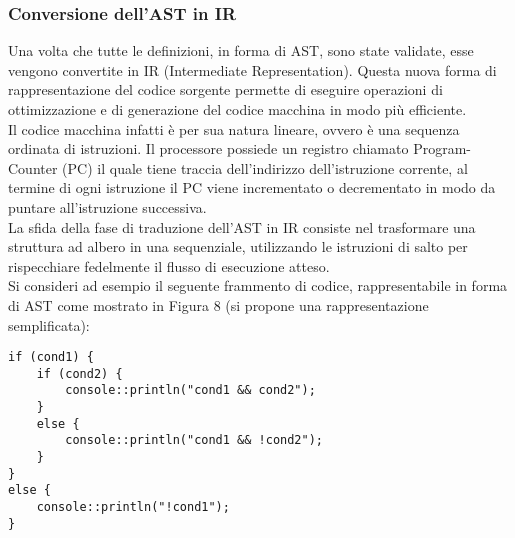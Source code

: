 \subsubsection{Conversione dell'AST in IR}
Una volta che tutte le definizioni, in forma di AST, sono state validate, esse vengono convertite in IR 
(Intermediate Representation). Questa nuova forma di rappresentazione del codice sorgente permette di
eseguire operazioni di ottimizzazione e di generazione del codice macchina in modo più efficiente. \\

Il codice macchina infatti è per sua natura lineare, ovvero è una sequenza ordinata di istruzioni. Il processore 
possiede un registro chiamato Program-Counter (PC) il quale tiene traccia dell'indirizzo dell'istruzione corrente, 
al termine di ogni istruzione il PC viene incrementato o decrementato in modo da puntare all'istruzione successiva. \\

La sfida della fase di traduzione dell'AST in IR consiste nel trasformare una struttura ad albero in una sequenziale,
utilizzando le istruzioni di salto per rispecchiare fedelmente il flusso di esecuzione atteso. \\

Si consideri ad esempio il seguente frammento di codice, rappresentabile in forma di AST 
come mostrato in Figura 8 (si propone una rappresentazione semplificata):

\vspace{0.5cm}
\begin{lstlisting}[frame=single]
if (cond1) {
    if (cond2) {
        console::println("cond1 && cond2");
    }
    else {
        console::println("cond1 && !cond2");
    }
}
else {
    console::println("!cond1");
}    
\end{lstlisting}
\vspace{0.5cm}

